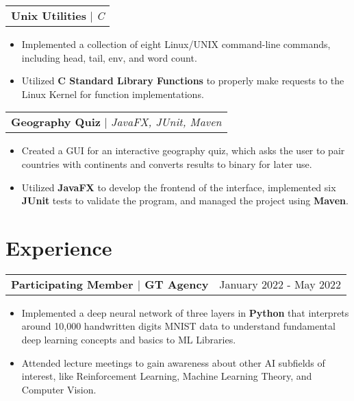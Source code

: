 \documentclass[letterpaper,11pt]{article}
\makeatletter
\newcommand{\resumeExperienceHeading}[2]{
    \begin{tabular*}{0.99\textwidth}[t]{l@{\extracolsep{\fill}}r}
      \textbf{#1} & #2 \\
    \end{tabular*}\vspace{-4pt}
}
\newcommand{\resumeProjectHeading}[2]{
    \begin{tabular*}{0.97\textwidth}[t]{l@{\extracolsep{\fill}}}
      \textbf{#1} $\vert$ \textit{#2} 
    \end{tabular*}\vspace{-4pt}
}
\newcommand{\resumeItemListStart}{\begin{itemize}[noitemsep]\vspace{-4pt}}
\newcommand{\resumeItemListEnd}{\end{itemize}}
\makeatother
\begin{document}
    \resumeProjectHeading{Unix Utilities}{C}
      \resumeItemListStart
        \item {Implemented a collection of eight Linux/UNIX command-line commands, including head, tail, env, and word count.}
        \item {Utilized \textbf{C Standard Library Functions} to properly make requests to the Linux Kernel for function implementations.}
      \resumeItemListEnd

    \resumeProjectHeading{Geography Quiz}{JavaFX, JUnit, Maven}
      \resumeItemListStart
        \item {Created a GUI for an interactive geography quiz, which asks the user to pair countries with continents and converts results to binary for later use.}
        \item {Utilized \textbf{JavaFX} to develop the frontend of the interface, implemented six \textbf{JUnit} tests to validate the program, and managed the project using \textbf{Maven}.}
      \resumeItemListEnd

\section{Experience}
  \resumeExperienceHeading
    {Participating Member $\vert$ GT Agency}{January 2022 - May 2022}
    \resumeItemListStart 
      \item {Implemented a deep neural network of three layers in \textbf{Python} that interprets around 10,000 handwritten digits MNIST data to understand 
      fundamental deep learning concepts and basics to ML Libraries.}
      \item {Attended lecture meetings to gain awareness about other AI subfields of interest, like Reinforcement Learning,
      Machine Learning Theory, and Computer Vision.}
    \resumeItemListEnd
\end{document}
